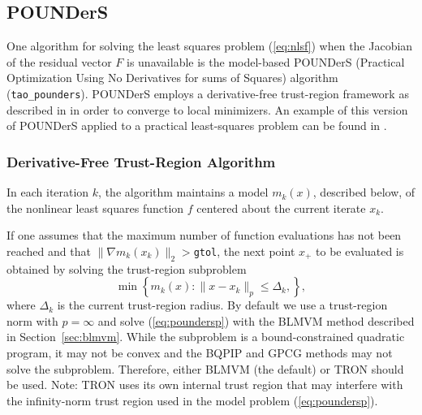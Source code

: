 \subsection{POUNDerS}\label{sec:pounders}
One algorithm for solving the least squares problem (\ref{eq:nlsf}) when
the Jacobian of the residual vector $F$ is unavailable is the model-based
POUNDerS (Practical Optimization Using No Derivatives for
sums of Squares) algorithm (\texttt{tao\_pounders}). 
POUNDerS employs a derivative-free trust-region framework as described in
\cite{Dfobook} in order to converge to local minimizers. An example of
this version of POUNDerS applied to a
practical least-squares problem can be found in \cite{UNEDF0}.

\subsubsection{Derivative-Free Trust-Region Algorithm}
In each iteration $k$, the algorithm maintains a model $m_k(x)$,
described below, of the nonlinear least squares function $f$ centered about
the current iterate $x_k$. 

If one assumes that the maximum number of function evaluations has not been
reached and that $\|\nabla m_k(x_k)\|_2>$\texttt{gtol}, the next point 
$x_+$ to be evaluated is obtained by solving the trust-region subproblem 
\begin{equation}
 \min\left\{
 m_k(x) : 
 \|x-x_k\|_{p} \leq \Delta_k, 
 \right \}, 
 \label{eq:poundersp}
\end{equation}
where $\Delta_k$ is the current 
trust-region radius. By default we use a trust-region norm with $p=\infty$
and solve (\ref{eq:poundersp}) with the BLMVM method described in
Section~\ref{sec:blmvm}.  While the subproblem is a bound-constrained
quadratic program, it may not be convex and the BQPIP and GPCG methods 
may not solve the subproblem.  Therefore, either BLMVM (the default) 
or TRON should be used.  Note: TRON uses its own internal trust region 
that may interfere with the infinity-norm trust region used in the 
model problem (\ref{eq:poundersp}).

